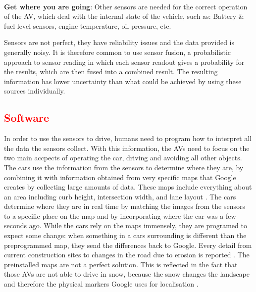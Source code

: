 \documentclass[11pt]{article}
\newcommand{\changed}[1]{\textcolor{red}{#1}}
\begin{document}
$~$\\
\textbf{Get where you are going}:
Other sensors are needed for the correct operation of the AV, which deal with the internal state of the vehicle, such as: Battery \& fuel level sensors, engine temperature, oil pressure, etc.

Sensors are not perfect, they have reliability issues and the data provided is generally noisy. It is therefore common to use sensor fusion, a probabilistic approach to sensor reading in which each sensor readout gives a probability for the results, which are then fused into a combined result. The resulting information has lower uncertainty than what could be achieved by using these sources individually. \cite{HellstromUmea}

\subsection{\changed{Software}}
In order to use the sensors to drive, humans need to program how to interpret all the data the sensors collect. With this information, the AVs need to focus on the two main accpects of operating the car, driving and avoiding all other objects. The cars use the information from the sensors to determine where they are, by combining it with information obtained from very specific maps that Google creates by collecting large amounts of data. These maps include everything about an area including curb height, intersection width, and lane layout \cite{chrisurmson2016}.
The cars determine where they are in real time by matching the images from the sensors to a specific place on the map and by incorporating where the car was a few seconds ago. While the cars rely on the maps immensely, they are programed to expect some change: when something in a cars surrounding is different than the preprogrammed map, they send the differences back to Google. Every detail from current construction sites to changes in the road due to erosion is reported \cite{chrisurmson2016}. The preinstalled maps are not a perfect solution. This is reflected in the fact that those AVs are not able to drive in snow, because the snow changes the landscape and therefore the physical markers Google uses for localisation \cite{chrisurmson2016}. 
\end{document}
